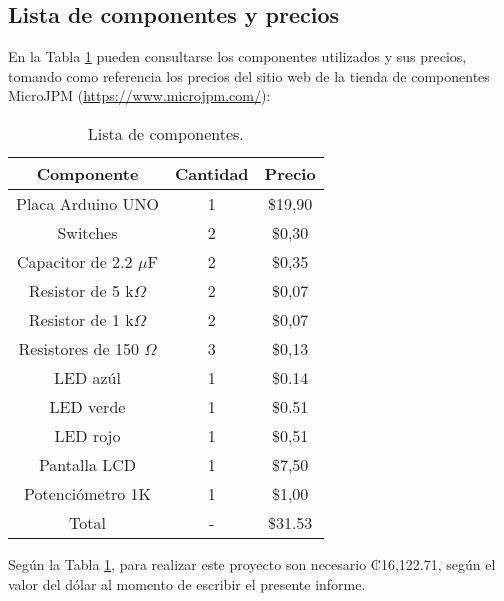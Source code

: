\subsection{Lista de componentes y precios}

En la Tabla \ref{table:Equipo} pueden consultarse los componentes utilizados y sus precios, tomando como referencia los precios del sitio web de la tienda de componentes MicroJPM (\url{https://www.microjpm.com/}): 

\begin{table}[H]
\caption{Lista de componentes.}
\begin{center}
\begin{tabular}{c|c|c}
\hline
\textbf{Componente}&\textbf{Cantidad}&\textbf{Precio}\\
\hline
Placa Arduino UNO & 1 & \$19,90\\
Switches & 2 & \$0,30\\
Capacitor de 2.2 $\mu$F & 2 & \$0,35\\
Resistor de 5 k$\Omega$ & 2 & \$0,07\\
Resistor de 1 k$\Omega$ & 2 & \$0,07\\
Resistores de 150 $\Omega$ & 3 & \$0,13\\
LED azúl & 1 & \$0.14\\ 
LED verde & 1 & \$0.51\\ 
LED rojo & 1 & \$0,51\\ 
Pantalla LCD & 1 & \$7,50\\ 
Potenciómetro 1K & 1 & \$1,00\\ 
\hline
Total & - & \$31.53\\
\end{tabular} \label{table:Equipo}
\end{center}
\end{table}

Según la Tabla \ref{table:Equipo}, para realizar este proyecto son necesario ₡16,122.71, según el valor del dólar al momento de escribir el presente informe. 